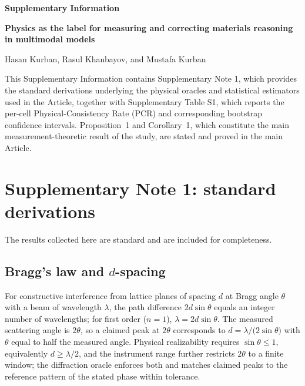 \documentclass[11pt,a4paper]{article}
\begin{document}
\begin{center}
{\Large\bfseries Supplementary Information\par}

\vspace{0.7em}

{\large\bfseries
Physics as the label for measuring and correcting materials reasoning in multimodal models
\par}

\vspace{0.8em}

{\normalsize
Hasan Kurban, Rasul Khanbayov, and Mustafa Kurban
\par}
\end{center}

\vspace{1.0em}

\noindent
This Supplementary Information contains Supplementary Note 1, which provides
the standard derivations underlying the physical oracles and statistical
estimators used in the Article, together with Supplementary Table S1, which
reports the per-cell Physical-Consistency Rate (PCR) and corresponding bootstrap
confidence intervals. Proposition~1 and Corollary~1, which constitute the main
measurement-theoretic result of the study, are stated and proved in the main
Article.

\vspace{0.5em}

\section*{Supplementary Note 1: standard derivations}
\noindent The results collected here are standard and are included for completeness.
\setcounter{subsection}{0}
\renewcommand{\thesubsection}{1.\arabic{subsection}}

\subsection{Bragg's law and \texorpdfstring{$d$}{d}-spacing}
For constructive interference from lattice planes of spacing $d$ at Bragg angle
$\theta$ with a beam of wavelength $\lambda$, the path difference $2d\sin\theta$ equals an
integer number of wavelengths; for first order ($n=1$), $\lambda=2d\sin\theta$. The
measured scattering angle is $2\theta$, so a claimed peak at $2\theta$ corresponds to
$d=\lambda/\!\big(2\sin\theta\big)$ with $\theta$ equal to half the measured angle.
Physical realizability requires $\sin\theta\le1$, equivalently $d\ge\lambda/2$, and the
instrument range further restricts $2\theta$ to a finite window; the diffraction oracle
enforces both and matches claimed peaks to the reference pattern of the stated phase
within tolerance.
\end{document}
